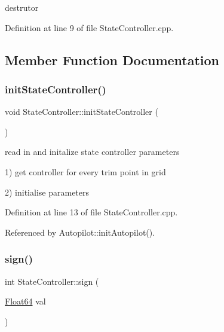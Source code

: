 destrutor 



Definition at line 9 of file State\+Controller.\+cpp.



\subsection{Member Function Documentation}
\mbox{\label{class_state_controller_a179258c5000de44f8a9b2b7dd0e63c68}} 
\subsubsection{\texorpdfstring{init\+State\+Controller()}{initStateController()}}
{\footnotesize\ttfamily void State\+Controller\+::init\+State\+Controller (\begin{DoxyParamCaption}{ }\end{DoxyParamCaption})}



read in and initalize state controller parameters 

1) get controller for every trim point in grid

2) initialise parameters 

Definition at line 13 of file State\+Controller.\+cpp.



Referenced by Autopilot\+::init\+Autopilot().

\mbox{\label{class_state_controller_a0ff3b733ea48d2190daf0c49dc5401e6}} 
\subsubsection{\texorpdfstring{sign()}{sign()}}
{\footnotesize\ttfamily int State\+Controller\+::sign (\begin{DoxyParamCaption}\item[{\hyperlink{group___tools_ga3f1431cb9f76da10f59246d1d743dc2c}{Float64}}]{val }\end{DoxyParamCaption})}



